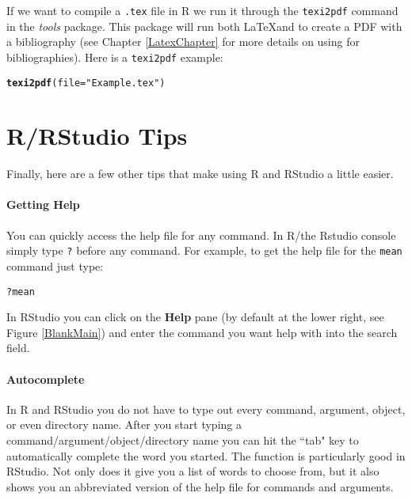 \documentclass[ChapterTOCs,krantz1]{krantz}\usepackage{graphicx, color}
\makeatletter
\newcommand{\hlfunctioncall}[1]{\textcolor[rgb]{0.501960784313725,0,0.329411764705882}{\textbf{#1}}}%
\newcommand{\hlstring}[1]{\textcolor[rgb]{0.6,0.6,1}{#1}}%
\newenvironment{kframe}{%
 \def\at@end@of@kframe{}%
 \ifinner\ifhmode%
  \def\at@end@of@kframe{\end{minipage}}%
  \begin{minipage}{\columnwidth}%
 \fi\fi%
 \def\FrameCommand##1{\hskip\@totalleftmargin \hskip-\fboxsep
 \colorbox{shadecolor}{##1}\hskip-\fboxsep
     \hskip-\linewidth \hskip-\@totalleftmargin \hskip\columnwidth}%
 \MakeFramed {\advance\hsize-\width
   \@totalleftmargin\z@ \linewidth\hsize
   \@setminipage}}%
 {\par\unskip\endMakeFramed%
 \at@end@of@kframe}
\newenvironment{knitrout}{}{} %
\makeatother
\begin{document}
\noindent If we want to compile a {\tt{.tex}} file in R we run it through the {\tt{texi2pdf}} command in the {\emph{tools}} package. This package will run both \LaTeX and \BibTeX to create a PDF with a bibliography (see Chapter \ref{LatexChapter} for more details on using \BibTeX for bibliographies). Here is a {\tt{texi2pdf}} example:

\begin{knitrout}
\color{fgcolor}\begin{kframe}
\begin{alltt}
\hlfunctioncall{texi2pdf}(file = \hlstring{"Example.tex"})
\end{alltt}
\end{kframe}
\end{knitrout}

 
\section{R/RStudio Tips}

Finally, here are a few other tips that make using R and RStudio a little easier.

\paragraph{Getting Help}

You can quickly access the help file for any command. In R/the Rstudio console simply type {\tt{?}} before any command. For example, to get the help file for the {\tt{mean}} command just type:

\begin{knitrout}
\color{fgcolor}\begin{kframe}
\begin{alltt}
?mean
\end{alltt}
\end{kframe}
\end{knitrout}


\noindent In RStudio you can click on the {\bf{Help}} pane (by default at the lower right, see Figure \ref{BlankMain}) and enter the command you want help with into the search field.

\paragraph{Autocomplete}

In R and RStudio you do not have to type out every command, argument, object, or even directory name. After you start typing a command/argument/object/directory name you can hit the ``tab" key to automatically complete the word you started. The  function is particularly good in RStudio. Not only does it give you a list of words to choose from, but it also shows you an abbreviated version of the help file for commands and arguments.
\end{document}
